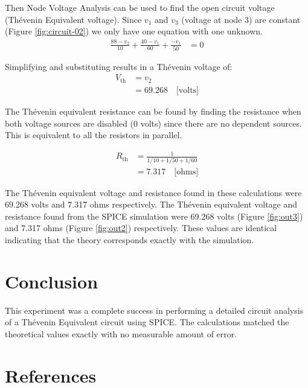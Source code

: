 \documentclass{article}
\begin{document}
Then Node Voltage Analysis can be used to find the open circuit voltage
(Th\'{e}venin Equivalent voltage).
Since $v_1$ and $v_3$ (voltage at node 3) are
constant (Figure \ref{fig:circuit-02}) we
only have one equation with one unknown.
\begin{align}
\frac{88 - v_2}{10} + \frac{40 - v_1}{60} + \frac{-v_1}{50} &= 0
\end{align}

Simplifying and substituting results in a Th\'{e}venin voltage of:
\begin{align}
	V_{\mbox{th}} &= v_2 \\
	              &= 69.268 \quad \mbox{[volts]}
\end{align}

The Th\'{e}venin equivalent resistance can be found by finding the resistance
when both voltage sources are disabled (0 volts) since there are
no dependent sources.
This is equivalent to all the resistors in parallel.

\begin{align}
	R_{\mbox{th}} &= \frac{1}{ 1/10 + 1/50 + 1/60} \\
				  &= 7.317 \quad \mbox{[ohms]}
\end{align}

The Th\'{e}venin equivalent voltage and resistance found in these
calculations were 69.268 volts and 7.317 ohms respectively.
The Th\'{e}venin equivalent voltage and resistance found from
the SPICE simulation were 69.268 volts (Figure \ref{fig:out3})
and 7.317 ohms (Figure \ref{fig:out2}) respectively.
These values are identical indicating that the theory corresponds
exactly with the simulation.


\section{Conclusion}

This experiment was a complete success in performing a detailed
circuit analysis of a Th\'{e}venin Equivalent circuit
using SPICE.
The calculations matched the theoretical values exactly
with no measurable amount of error.



\renewcommand*{\refname}{\vspace{-8mm}}
\section{References}


\end{document}
